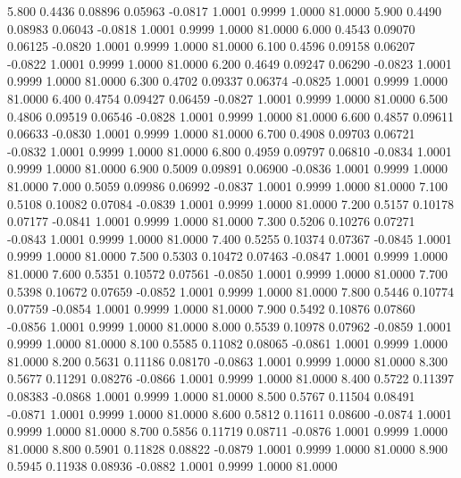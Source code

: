    5.800   0.4436   0.08896   0.05963  -0.0817   1.0001   0.9999   1.0000  81.0000
   5.900   0.4490   0.08983   0.06043  -0.0818   1.0001   0.9999   1.0000  81.0000
   6.000   0.4543   0.09070   0.06125  -0.0820   1.0001   0.9999   1.0000  81.0000
   6.100   0.4596   0.09158   0.06207  -0.0822   1.0001   0.9999   1.0000  81.0000
   6.200   0.4649   0.09247   0.06290  -0.0823   1.0001   0.9999   1.0000  81.0000
   6.300   0.4702   0.09337   0.06374  -0.0825   1.0001   0.9999   1.0000  81.0000
   6.400   0.4754   0.09427   0.06459  -0.0827   1.0001   0.9999   1.0000  81.0000
   6.500   0.4806   0.09519   0.06546  -0.0828   1.0001   0.9999   1.0000  81.0000
   6.600   0.4857   0.09611   0.06633  -0.0830   1.0001   0.9999   1.0000  81.0000
   6.700   0.4908   0.09703   0.06721  -0.0832   1.0001   0.9999   1.0000  81.0000
   6.800   0.4959   0.09797   0.06810  -0.0834   1.0001   0.9999   1.0000  81.0000
   6.900   0.5009   0.09891   0.06900  -0.0836   1.0001   0.9999   1.0000  81.0000
   7.000   0.5059   0.09986   0.06992  -0.0837   1.0001   0.9999   1.0000  81.0000
   7.100   0.5108   0.10082   0.07084  -0.0839   1.0001   0.9999   1.0000  81.0000
   7.200   0.5157   0.10178   0.07177  -0.0841   1.0001   0.9999   1.0000  81.0000
   7.300   0.5206   0.10276   0.07271  -0.0843   1.0001   0.9999   1.0000  81.0000
   7.400   0.5255   0.10374   0.07367  -0.0845   1.0001   0.9999   1.0000  81.0000
   7.500   0.5303   0.10472   0.07463  -0.0847   1.0001   0.9999   1.0000  81.0000
   7.600   0.5351   0.10572   0.07561  -0.0850   1.0001   0.9999   1.0000  81.0000
   7.700   0.5398   0.10672   0.07659  -0.0852   1.0001   0.9999   1.0000  81.0000
   7.800   0.5446   0.10774   0.07759  -0.0854   1.0001   0.9999   1.0000  81.0000
   7.900   0.5492   0.10876   0.07860  -0.0856   1.0001   0.9999   1.0000  81.0000
   8.000   0.5539   0.10978   0.07962  -0.0859   1.0001   0.9999   1.0000  81.0000
   8.100   0.5585   0.11082   0.08065  -0.0861   1.0001   0.9999   1.0000  81.0000
   8.200   0.5631   0.11186   0.08170  -0.0863   1.0001   0.9999   1.0000  81.0000
   8.300   0.5677   0.11291   0.08276  -0.0866   1.0001   0.9999   1.0000  81.0000
   8.400   0.5722   0.11397   0.08383  -0.0868   1.0001   0.9999   1.0000  81.0000
   8.500   0.5767   0.11504   0.08491  -0.0871   1.0001   0.9999   1.0000  81.0000
   8.600   0.5812   0.11611   0.08600  -0.0874   1.0001   0.9999   1.0000  81.0000
   8.700   0.5856   0.11719   0.08711  -0.0876   1.0001   0.9999   1.0000  81.0000
   8.800   0.5901   0.11828   0.08822  -0.0879   1.0001   0.9999   1.0000  81.0000
   8.900   0.5945   0.11938   0.08936  -0.0882   1.0001   0.9999   1.0000  81.0000
